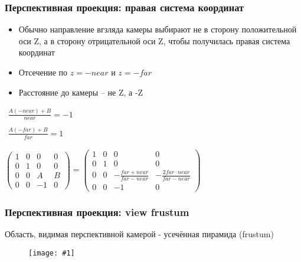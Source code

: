 \documentclass[10pt]{beamer}
\newcommand{\slideimage}[1]{
  \begin{figure}
    \begin{adjustbox}{width=\textwidth, totalheight=\textheight-2\baselineskip-2\baselineskip,keepaspectratio}
      \texttt{[image: \#1]}
    \end{adjustbox}
  \end{figure}
}
\begin{document}
\begin{frame}[fragile]
\frametitle{Перспективная проекция: правая система координат}
\begin{itemize}
\item Обычно направление вгзляда камеры выбирают не в сторону положительной оси Z, а в сторону отрицательной оси Z, чтобы получилась правая система координат
\pause
\item Отсечение по \begin{math}z=-near\end{math} и \begin{math}z=-far\end{math}
\pause
\item Расстояние до камеры -- не Z, а -Z
\end{itemize}
\pause
\begin{center}
\begin{math}
\begin{matrix}
\frac{A(-near)+B}{near} = -1 \\ \\
\frac{A(-far)+B}{far} = 1
\end{matrix}
\end{math}
\end{center}
\pause
\begin{center}
\begin{math}
\begin{pmatrix}
1 & 0 & 0 & 0 \\
0 & 1 & 0 & 0 \\
0 & 0 & A & B \\
0 & 0 & -1 & 0
\end{pmatrix}
=
\begin{pmatrix}
1 & 0 & 0 & 0 \\
0 & 1 & 0 & 0 \\
0 & 0 & -\frac{far + near}{far - near} & -\frac{2 far \cdot near}{far - near} \\
0 & 0 & -1 & 0
\end{pmatrix}
\end{math}
\end{center}
\end{frame}

\begin{frame}[fragile]
\frametitle{Перспективная проекция: view frustum}
Область, видимая перспективной камерой - усечённая пирамида (frustum)
\slideimage{frustum.png}
\end{frame}
\end{document}
